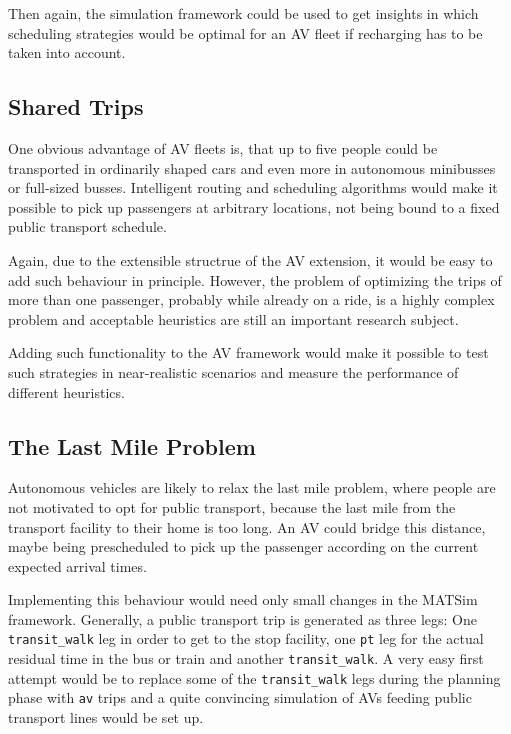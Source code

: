 Then again, the simulation framework could be used to get insights in which scheduling
strategies would be optimal for an AV fleet if recharging has to be taken into account.

\subsection{Shared Trips}

One obvious advantage of AV fleets is, that up to five people could be transported
in ordinarily shaped cars and even more in autonomous minibusses or full-sized busses.
Intelligent routing and scheduling algorithms would make it possible to pick up passengers
at arbitrary locations, not being bound to a fixed public transport schedule.

Again, due to the extensible structrue of the AV extension, it would be easy to
add such behaviour in principle. However, the problem of optimizing the trips of
more than one passenger, probably while already on a ride, is a highly complex
problem and acceptable heuristics are still an important research subject.

Adding such functionality to the AV framework would make it possible to test such
strategies in near-realistic scenarios and measure the performance of different
heuristics.


\subsection{The Last Mile Problem}

Autonomous vehicles are likely to relax the last mile problem, where people are not
motivated to opt for public transport, because the last mile from the transport
facility to their home is too long. An AV could bridge this distance, maybe being
prescheduled to pick up the passenger according on the current expected arrival
times.

Implementing this behaviour would need only small changes in the MATSim framework.
Generally, a public transport trip is generated as three legs: One \texttt{transit\_walk}
leg in order to get to the stop facility, one \texttt{pt} leg for the actual residual
time in the bus or train and another \texttt{transit\_walk}. A very easy first attempt
would be to replace some of the \texttt{transit\_walk} legs during the planning
phase with \texttt{av} trips and a quite convincing simulation of AVs feeding
public transport lines would be set up.

